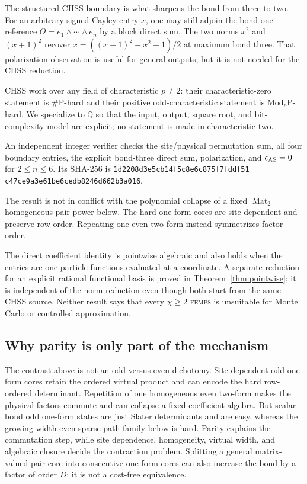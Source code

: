 \documentclass[11pt]{article}
\theoremstyle{definition}
\newcommand{\Mat}{\operatorname{Mat}}
\newcommand{\FEMPS}{\textnormal{\textsc{femps}}}
\begin{document}
The structured CHSS boundary is what sharpens the bond from three to two.  For
an arbitrary signed Cayley entry $x$, one may still adjoin the bond-one
reference $\Theta=e_1\wedge\cdots\wedge e_n$ by a block direct sum.  The two
norms $x^2$ and $(x+1)^2$ recover
$x=((x+1)^2-x^2-1)/2$ at maximum bond three.  That polarization observation is
useful for general outputs, but it is not needed for the CHSS reduction.

CHSS work over any field of characteristic $p\ne2$: their characteristic-zero
statement is \#P-hard and their positive odd-characteristic statement is
$\mathrm{Mod}_p\mathrm P$-hard.  We specialize to $\mathbb Q$ so that the
input, output, square root, and bit-complexity model are explicit; no statement
is made in characteristic two.

An independent integer verifier checks the site/physical permutation sum,
all four boundary entries, the explicit bond-three direct sum, polarization,
and $\epsilon_{\rm AS}=0$ for $2\le n\le6$.  Its SHA-256 is
\texttt{1d2208d3e5cb14f5c8e6c875f7fddf51}\allowbreak
\texttt{c47ce9a3e61be6cedb8246d662b3a016}.

The result is not in conflict with the polynomial collapse of a fixed
$\Mat_2$ homogeneous pair power below.  The hard one-form cores are
site-dependent and preserve row order.  Repeating one even two-form instead
symmetrizes factor order.

The direct coefficient identity is pointwise algebraic and also holds when
the entries are one-particle functions evaluated at a coordinate.  A separate
reduction for an explicit rational functional basis is proved in
Theorem~\ref{thm:pointwise}; it is independent of the norm reduction even
though both start from the same CHSS source.  Neither result says that every
$\chi\ge2$ \FEMPS{} is unsuitable for Monte Carlo or controlled approximation.

\subsection{Why parity is only part of the mechanism}

The contrast above is not an odd-versus-even dichotomy.  Site-dependent odd
one-form cores retain the ordered virtual product and can encode the hard
row-ordered determinant.  Repetition of one homogeneous even two-form makes
the physical factors commute and can collapse a fixed coefficient algebra.
But scalar-bond odd one-form states are just Slater determinants and are easy,
whereas the growing-width even sparse-path family below is hard.  Parity
explains the commutation step, while site dependence, homogeneity, virtual
width, and algebraic closure decide the contraction problem.  Splitting a
general matrix-valued pair core into consecutive one-form cores can also
increase the bond by a factor of order $D$; it is not a cost-free equivalence.
\end{document}
